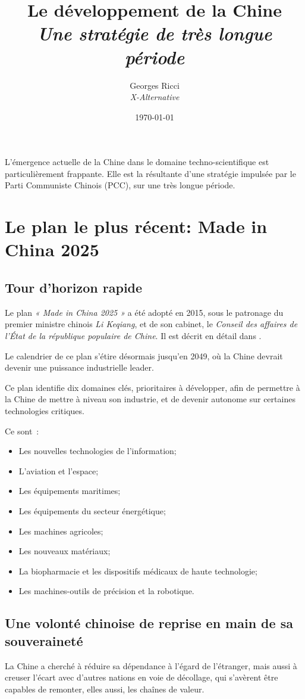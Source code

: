 \documentclass[a4paper]{article}
\author{Georges Ricci\\
\large \textit{X-Alternative}}
\date{\today}
\title{Le développement de la Chine\\ 
 \large \textit{Une stratégie de très longue période}
 }
\begin{document}
\maketitle 

\newpage
\tableofcontents
\newpage

L’émergence actuelle de la Chine dans le domaine techno-scientifique est particulièrement frappante. Elle est la résultante d’une stratégie impulsée par le Parti Communiste Chinois (PCC), sur une très longue période.

\section{Le plan le plus récent: Made in China 2025}
\label{sec:org5915e2c}
\subsection{Tour d’horizon rapide}
\label{sec:org35ecd62}
Le plan \textit{« Made in China 2025 »} a été adopté en 2015, sous le patronage du premier ministre chinois \textit{Li Keqiang}, et de son cabinet, le \textit{Conseil des affaires de l'État de la république populaire de Chine}. Il est décrit en détail dans \cite{Made_In_China_2025}. 

Le calendrier de ce plan s’étire désormais jusqu’en 2049, où la Chine devrait devenir une puissance industrielle leader. \cite{Evolving_MiC25} 

Ce plan identifie dix domaines clés, prioritaires à développer, afin de permettre à la Chine de mettre à niveau son industrie, et de devenir autonome sur certaines technologies critiques.

Ce sont~:
\begin{itemize}
\item Les nouvelles technologies de l’information;
\item L’aviation et l’espace;
\item Les équipements maritimes;
\item Les équipements du secteur énergétique;
\item Les machines agricoles;
\item Les nouveaux matériaux;
\item La biopharmacie et les dispositifs médicaux de haute technologie;
\item Les machines-outils de précision et la robotique.
\end{itemize}

\subsection{Une volonté chinoise de reprise en main de sa souveraineté}
\label{sec:orgf222c4b}
La Chine a cherché à réduire sa dépendance à l’égard de l’étranger, mais aussi à creuser l’écart avec d’autres nations en voie de décollage, qui s’avèrent être capables de remonter, elles aussi, les chaînes de valeur. 
\end{document}
